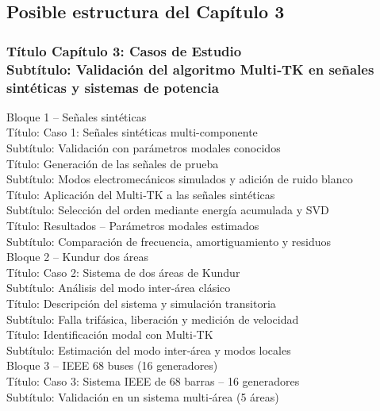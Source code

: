  
    \subsection{Posible estructura del Capítulo 3}
\subsubsection{Título Capítulo 3: Casos de Estudio\\
Subtítulo: Validación del algoritmo Multi‑TK en señales sintéticas y sistemas de potencia\\}

Bloque 1 – Señales sintéticas\\
Título: Caso 1: Señales sintéticas multi-componente\\
Subtítulo: Validación con parámetros modales conocidos\\

Título: Generación de las señales de prueba\\
Subtítulo: Modos electromecánicos simulados y adición de ruido blanco\\

Título: Aplicación del Multi‑TK a las señales sintéticas\\
Subtítulo: Selección del orden mediante energía acumulada y SVD\\

Título: Resultados – Parámetros modales estimados\\
Subtítulo: Comparación de frecuencia, amortiguamiento y residuos\\

Bloque 2 – Kundur dos áreas\\
Título: Caso 2: Sistema de dos áreas de Kundur\\
Subtítulo: Análisis del modo inter‑área clásico\\

Título: Descripción del sistema y simulación transitoria\\
Subtítulo: Falla trifásica, liberación y medición de velocidad\\

Título: Identificación modal con Multi‑TK\\
Subtítulo: Estimación del modo inter‑área y modos locales\\

  Bloque 3 – IEEE 68 buses (16 generadores)\\
Título: Caso 3: Sistema IEEE de 68 barras – 16 generadores\\
Subtítulo: Validación en un sistema multi‑área (5 áreas)\\

